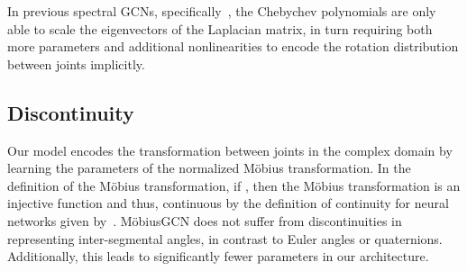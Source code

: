 \documentclass[runningheads]{llncs}
\begin{document}
In previous spectral GCNs, specifically~\cite{kipf2016semi}, the Chebychev polynomials are only able to scale the eigenvectors of the Laplacian matrix, in turn requiring both more parameters and additional nonlinearities to encode the rotation distribution between joints implicitly. 

\subsection{Discontinuity}
Our model encodes the transformation between joints in the complex domain by learning the parameters of the normalized M\"obius transformation.
In the definition of the M\"obius transformation, if , then the M\"obius transformation is an injective function and thus, continuous by the definition of continuity for neural networks given by~\cite{zhou2019continuity}.
M\"obiusGCN does not suffer from discontinuities in representing inter-segmental angles, in contrast to Euler angles or quaternions. Additionally, this leads to significantly fewer parameters in our architecture.
\end{document}
